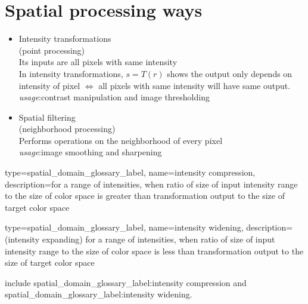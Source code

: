 \section{Spatial processing ways}

\begin{itemize}
\item
  Intensity transformations\\
  (point processing)\\
  Its inputs are all pixels with same intensity\\
  In intensity transformations, $s=T(r)$ shows the output only depends on
  intensity of pixel $\Leftrightarrow$  all pixels with same intensity will have
  same output.\\
  \emph{usage}:contrast manipulation and image thresholding
\item
  Spatial ﬁltering\\
  (neighborhood processing)\\
  Performs operations on the neighborhood of every pixel\\
  \emph{usage}:image smoothing and sharpening
\end{itemize}

{
type={spatial_domain_glossary_label},
name={intensity compression},
description={for a range of intensities, when ratio of size of input intensity range to the size of color space is greater than transformation output to the size of target color space}}

{
type={spatial_domain_glossary_label},
name={intensity widening},
description={(intensity expanding) for a range of intensities, when ratio of
size of input intensity range to the size of color space is less than
transformation output to the size of target color space}}


include \gls{spatial_domain_glossary_label:intensity compression} and \gls{spatial_domain_glossary_label:intensity widening}.
 
\printglossary[type=spatial_domain_glossary_label]
